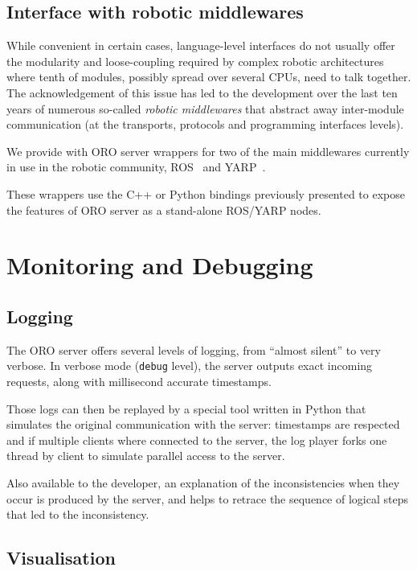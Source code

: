 \subsection{Interface with robotic middlewares}
\label{sect|interfacing-middlewares}

While convenient in certain cases, language-level interfaces do not usually
offer the modularity and loose-coupling required by complex robotic
architectures where tenth of modules, possibly spread over several CPUs, need
to talk together. The acknowledgement of this issue has led to the development
over the last ten years of numerous so-called \emph{robotic middlewares} that
abstract away inter-module communication (at the transports, protocols and
programming interfaces levels).

We provide with ORO server wrappers for two of the main middlewares currently
in use in the robotic community, ROS~\cite{Quigley2009} and
YARP~\cite{Metta2006}.

These wrappers use the C++ or Python bindings previously presented to expose
the features of ORO server as a stand-alone ROS/YARP nodes.

\section{Monitoring and Debugging}
\label{sect|monitoring}

\subsection{Logging}

The ORO server offers several levels of logging, from ``almost silent'' to very
verbose. In verbose mode ({\tt debug} level), the server outputs exact incoming
requests, along with millisecond accurate timestamps.

Those logs can then be replayed by a special tool written in Python that
simulates the original communication with the server: timestamps are respected
and if multiple clients where connected to the server, the log player forks one
thread by client to simulate parallel access to the server.

Also available to the developer, an explanation of the inconsistencies when
they occur is produced by the server, and helps to retrace the sequence of
logical steps that led to the inconsistency.

\subsection{Visualisation}

